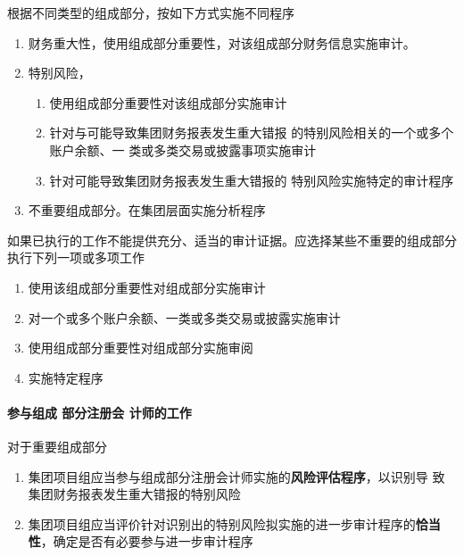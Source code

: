 \documentclass[UTF8,12pt]{ctexart}
\numberwithin{equation}{section} %
\numberwithin{figure}{section}
\numberwithin{table}{section}
\begin{document}
	根据不同类型的组成部分，按如下方式实施不同程序
	\begin{enumerate}
		\item 财务重大性，使用组成部分重要性，对该组成部分财务信息实施审计。
		
		\item 特别风险，
		\begin{enumerate}
			\item 使用组成部分重要性对该组成部分实施审计 
			
			\item 针对与可能导致集团财务报表发生重大错报 的特别风险相关的一个或多个账户余额、一 类或多类交易或披露事项实施审计 
			
			\item 针对可能导致集团财务报表发生重大错报的 特别风险实施特定的审计程序
			
		\end{enumerate}
		
		\item 不重要组成部分。在集团层面实施分析程序
	\end{enumerate}
	
	如果已执行的工作不能提供充分、适当的审计证据。应选择某些不重要的组成部分执行下列一项或多项工作
	\begin{enumerate}
		\item 使用该组成部分重要性对组成部分实施审计
		
		\item 对一个或多个账户余额、一类或多类交易或披露实施审计
		
		\item 使用组成部分重要性对组成部分实施审阅
		
		\item 实施特定程序
	\end{enumerate}
	
	\paragraph{参与组成 部分注册会 计师的工作}
	
	对于重要组成部分
	\begin{enumerate}
		\item 集团项目组应当参与组成部分注册会计师实施的\textbf{风险评估程序}，以识别导 致集团财务报表发生重大错报的特别风险
		
		\item 集团项目组应当评价针对识别出的特别风险拟实施的进一步审计程序的\textbf{恰当性}，确定是否有必要参与进一步审计程序
	\end{enumerate}
	
\end{document}
